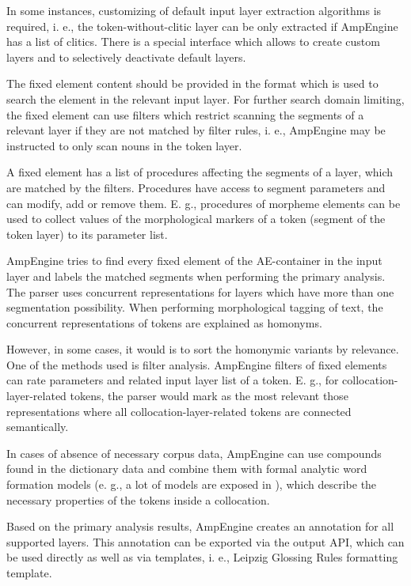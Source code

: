 \documentclass[b5paper,notitlepage]{article}
\begin{document}
In some instances, customizing of default input layer extraction algorithms is required, i. e., the token-without-clitic layer can be only extracted if AmpEngine has a list of clitics. There is a special interface which allows to create custom layers and to selectively deactivate default layers.

The fixed element content should be provided in the format which is used to search the element in the relevant input layer. For further search domain limiting, the fixed element can use filters which restrict scanning the segments of a relevant layer if they are not matched by filter rules, i. e., AmpEngine may be instructed to only scan nouns in the token layer.

A fixed element has a list of procedures affecting the segments of a layer, which are matched by the filters. Procedures have access to segment parameters and can modify, add or remove them. E. g., procedures of morpheme elements can be used to collect values of the morphological markers of a token (segment of the token layer) to its parameter list.

AmpEngine tries to find every fixed element of the AE-container in the input layer and labels the matched segments when performing the primary analysis. The parser uses concurrent representations for layers which have more than one segmentation possibility. When performing morphological tagging of text, the concurrent representations of tokens are explained as homonyms.

However, in some cases, it would is to sort the homonymic variants by relevance. One of the methods used is filter analysis. AmpEngine filters of fixed elements can rate parameters and related input layer list of a token. E. g., for collocation-layer-related tokens, the parser would mark as the most relevant those representations where all collocation-layer-related tokens are connected semantically.

In cases of absence of necessary corpus data, AmpEngine can use compounds found in the dictionary data and combine them with formal analytic word formation models (e. g., a lot of models are exposed in \cite{Rombandeeva vogul}), which describe the necessary properties of the tokens inside a collocation.

Based on the primary analysis results, AmpEngine creates an annotation for all supported layers. This annotation can be exported via the output API, which can be used directly as well as via templates, i. e., Leipzig Glossing Rules formatting template.
\end{document}
